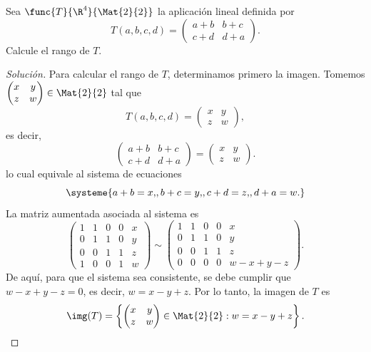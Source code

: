 \documentclass[a4,11pt]{aleph-notas}
\begin{document}
\begin{ejer}
	Sea $\func{T}{\R^4}{\Mat{2}{2}}$ la aplicación lineal definida por
	\[
		T(a,b,c,d)=
		\begin{pmatrix}
			a+b & b+c\\
			c+d & d+a
		\end{pmatrix}.
	\]
	Calcule el rango de $T$.
\end{ejer}

\begin{proof}[Solución]
	Para calcular el rango de $T$, determinamos primero la imagen. Tomemos $\begin{pmatrix}x & y\\
z & w
\end{pmatrix}\in\Mat{2}{2}$ tal que
	\[
		T(a,b,c,d)=
		\begin{pmatrix}
			x & y\\
            z & w
		\end{pmatrix},
	\]
    es decir,
    \[
        \begin{pmatrix}
			a+b & b+c\\
			c+d & d+a
		\end{pmatrix}=
        \begin{pmatrix}
            x & y\\
            z & w
        \end{pmatrix}.
    \]
	lo cual equivale al sistema de ecuaciones
	\[
		\systeme{
		a+b = x{,},
		b+c = y{,},
		c+d = z{,},
		d+a = w{.}
		}
	\]
	La matriz aumentada asociada al sistema es
	\[
		\left(
		\begin{array}{cccc|c}
			1 & 1 & 0 & 0 & x\\
			0 & 1 & 1 & 0 & y\\
			0 & 0 & 1 & 1 & z\\
			1 & 0 & 0 & 1 & w
		\end{array}
		\right)
		\sim
		\left(
		\begin{array}{cccc|c}
			1 & 1 & 0 & 0 & x\\
			0 & 1 & 1 & 0 & y\\
			0 & 0 & 1 & 1 & z\\
			0 & 0 & 0 & 0 & w-x+y-z
		\end{array}
		\right).
	\]
	De aquí, para que el sistema sea consistente, se debe cumplir que $w-x+y-z=0$, es decir, $w=x-y+z$. Por lo tanto, la imagen de $T$ es
    \[
        \img(T)=\left\{\begin{pmatrix}x & y\\
            z & w
            \end{pmatrix}\in\Mat{2}{2}: w=x-y+z\right\}.
\]
\end{proof}
\end{document}
